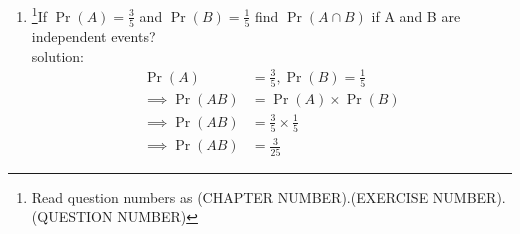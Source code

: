 \documentclass[10pt, a4paper]{article}
\title{\mytitle}
\author{\myauthor\hspace{1em}\\FWC22088\hspace{6.5em}IITH\hspace{0.5em}\mymodule\hspace{6em}Probability}
\providecommand{\pr}[1]{\ensuremath{\Pr\left(#1\right)}}
\begin{document}
	\maketitle
\begin{enumerate}[label=13.\arabic{enumi}.\arabic{enumii}]

\setcounter{enumi}{1}
\setcounter{enumii}{1}
\item \footnote{Read question numbers as (CHAPTER NUMBER).(EXERCISE NUMBER).(QUESTION NUMBER)}If $\pr{A} = \frac{3}{5}$ and $\pr{B} = \frac{1}{5}$ find $\pr{A \cap B}$ if A and B are independent events?\\
solution:
\begin{align}
 \pr{A}&= \frac{3}{5},\pr{B}=\frac{1}{5}\\
\implies \pr{AB}&= \pr{A} \times \pr{B}\\
\implies \pr{AB}&= \frac{3}{5} \times \frac{1}{5}\\
\implies \pr{AB}&= \frac{3}{25}
\end{align}
\end{enumerate}
\end{document}
